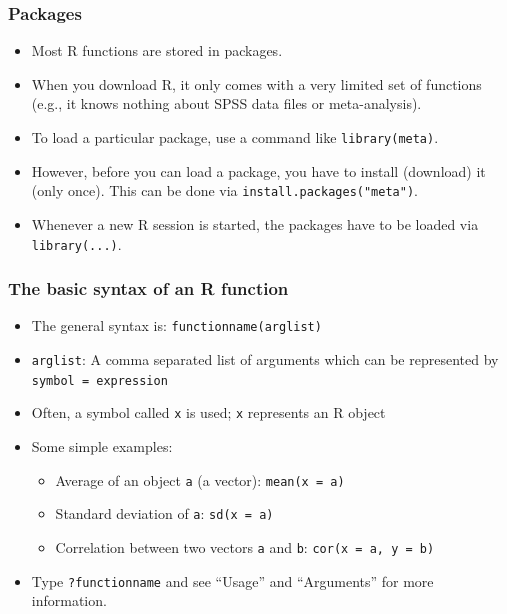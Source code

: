 \documentclass[bigger]{beamer}
\begin{document}
\begin{frame}
\frametitle{Packages}
\label{sec-1-1-11}

\begin{itemize}
\item Most R functions are stored in packages.
\item When you download R, it only comes with a very limited set of functions
      (e.g., it knows nothing about SPSS data files or meta-analysis).
\item To load a particular package, use a command like \texttt{library(meta)}.
\item However, before you can load a package, you have to install (download)
      it (only once). This can be done via \texttt{install.packages("meta")}.
\item Whenever a new R session is started, the packages have to be loaded via
      \texttt{library(...)}.
\end{itemize}
\vfill
{}
\end{frame}
\begin{frame}
\frametitle{The basic syntax of an R function}
\label{sec-1-1-12}

\begin{itemize}
\item The general syntax is: \texttt{functionname(arglist)}
\item \texttt{arglist}: A comma separated list of arguments which can be represented by
      \\ \texttt{symbol = expression}
\item Often, a symbol called \texttt{x} is used; \texttt{x} represents an R object
\item Some simple examples:
\begin{itemize}
\item Average of an object \texttt{a} (a vector):  \texttt{mean(x = a)}
\item Standard deviation of \texttt{a}: \texttt{sd(x = a)}
\item Correlation between two vectors \texttt{a} and \texttt{b}: \texttt{cor(x = a, y = b)}
\end{itemize}
\item Type \texttt{?functionname} and see \enquote{Usage} and \enquote{Arguments} for more information.
\end{itemize}
\end{frame}
\end{document}
